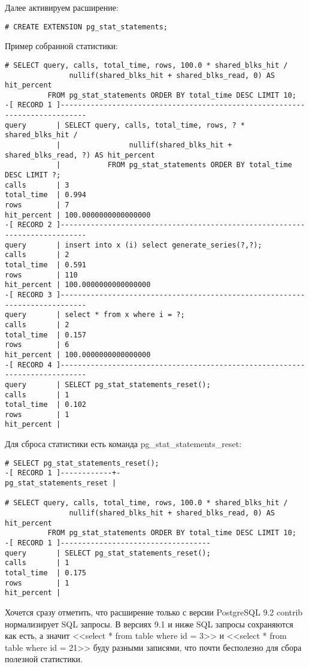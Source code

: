 Далее активируем расширение:

\begin{lstlisting}[label=lst:sql_performance13,caption=Активация pg\_stat\_statements]
# CREATE EXTENSION pg_stat_statements;
\end{lstlisting}

Пример собранной статистики:

\begin{lstlisting}[label=lst:sql_performance14,caption=pg\_stat\_statements статистика]
# SELECT query, calls, total_time, rows, 100.0 * shared_blks_hit /
               nullif(shared_blks_hit + shared_blks_read, 0) AS hit_percent
          FROM pg_stat_statements ORDER BY total_time DESC LIMIT 10;
-[ RECORD 1 ]----------------------------------------------------------------------------
query       | SELECT query, calls, total_time, rows, ? * shared_blks_hit /
            |                nullif(shared_blks_hit + shared_blks_read, ?) AS hit_percent
            |           FROM pg_stat_statements ORDER BY total_time DESC LIMIT ?;
calls       | 3
total_time  | 0.994
rows        | 7
hit_percent | 100.0000000000000000
-[ RECORD 2 ]----------------------------------------------------------------------------
query       | insert into x (i) select generate_series(?,?);
calls       | 2
total_time  | 0.591
rows        | 110
hit_percent | 100.0000000000000000
-[ RECORD 3 ]----------------------------------------------------------------------------
query       | select * from x where i = ?;
calls       | 2
total_time  | 0.157
rows        | 6
hit_percent | 100.0000000000000000
-[ RECORD 4 ]----------------------------------------------------------------------------
query       | SELECT pg_stat_statements_reset();
calls       | 1
total_time  | 0.102
rows        | 1
hit_percent |
\end{lstlisting}

Для сброса статистики есть команда pg\_stat\_statements\_reset:

\begin{lstlisting}[label=lst:sql_performance15,caption=Сброс статистика]
# SELECT pg_stat_statements_reset();
-[ RECORD 1 ]------------+-
pg_stat_statements_reset |

# SELECT query, calls, total_time, rows, 100.0 * shared_blks_hit /
               nullif(shared_blks_hit + shared_blks_read, 0) AS hit_percent
          FROM pg_stat_statements ORDER BY total_time DESC LIMIT 10;
-[ RECORD 1 ]-----------------------------------
query       | SELECT pg_stat_statements_reset();
calls       | 1
total_time  | 0.175
rows        | 1
hit_percent |
\end{lstlisting}

Хочется сразу отметить, что расширение только с версии PostgreSQL 9.2 contrib нормализирует SQL запросы. В версиях 9.1 и ниже SQL запросы сохраняются как есть, а значит <<select * from table where id = 3>> и <<select * from table where id = 21>> буду разными записями, что почти бесполезно для сбора полезной статистики.
